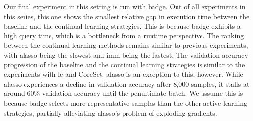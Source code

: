 Our final experiment in this setting is run with \gls{badge}. Out of all experiments in this series, this one shows the
smallest relative gap in execution time between the baseline and the continual learning strategies. This is because \gls{badge} exhibits a high query time, which is a bottleneck from a runtime perspective. 
The ranking between the continual learning methods remains similar to previous experiments, with \gls{alasso} being the slowest and \gls{imm} being the fastest.
The validation accuracy progression of the baseline and the continual learning strategies is similar to the experiments with \gls{lc} and CoreSet.
\gls{alasso} is an exception to this, however. While \gls{alasso} experiences a decline in validation accuracy after 8,000 samples, it stalls at around 60\% validation accuracy until the penultimate batch.
We assume this is because \gls{badge} selects more representative samples than the other active learning strategies, partially alleviating \gls{alasso}'s problem of exploding gradients. \par


